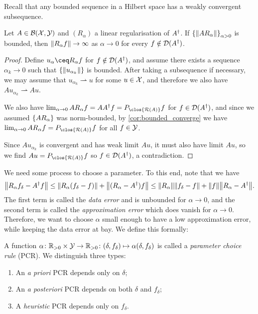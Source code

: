 \begin{recap}
	Recall that any bounded sequence in a Hilbert space has a weakly convergent subsequence. 
\end{recap}
\begin{theorem}
	Let $A \in \mathcal B(\mathcal X, \mathcal Y)$ and $(R_\alpha)$ a linear regularisation of $A^\dagger$. If $\qty{\norm{A R_\alpha}}_{\alpha > 0}$ is bounded, then $\norm{R_\alpha f} \to \infty$ as $\alpha \to 0$ for every $f \notin \operatorname{\mathcal D}(A^\dagger)$. 
\end{theorem}

\begin{proof}
	Define $u_\alpha \ceq R_\alpha f$ for $f \notin \operatorname{\mathcal D}(A^\dagger)$, and assume there exists a sequence $\alpha_k \to 0$ such that $\qty{\norm{u_{\alpha_k}}}$ is bounded. After taking a subsequence if necessary, we may assume that $u_{\alpha_k} \rightharpoonup u$ for some $u \in \mathcal X$, and therefore we also have $Au_{\alpha_k} \rightharpoonup Au$. 
	
	We also have $\lim_{\alpha \to 0} A R_\alpha f = AA\D f = P_{\clos{\Ran(A)}}f$ for $f \in \operatorname{\mathcal D}(A^\dagger)$, and since we assumed $\qty{A R_\alpha}$ was norm-bounded, by \cref{cor:bounded_converge} we have $\lim_{\alpha \to 0} AR_\alpha f = P_{\clos{\Ran(A)}} f$ for all $f \in \mathcal Y$. 
	
	Since $Au_{\alpha_k}$ is convergent and has weak limit $Au$, it must also have limit $Au$, so we find $Au = P_{\clos{\Ran(A)}} f$ so $f \in \operatorname{\mathcal D}(A^\dagger)$, a contradiction. 
\end{proof}

We need some process to choose a parameter. To this end, note that we have
\[
\norm{R_\alpha f_\delta - A^\dagger f} \leq \norm{R_\alpha (f_\delta - f)} + \norm{(R_\alpha - A^\dagger) f} \\
\leq  \norm{R_\alpha} \norm{f_\delta - f} + \norm{f} \norm{R_\alpha - A^\dagger}. 
\]
The first term is called the \emph{data error} and is unbounded for $\alpha \to 0$, and the second term is called the \emph{approximation error} which does vanish for $\alpha \to 0$. Therefore, we want to choose $\alpha$ small enough to have a low approximation error, while keeping the data error at bay. We define this formally:

\begin{definition}
	A function $\alpha \colon  \mathbb R_{> 0} \times \mathcal Y \to \mathbb R_{> 0} \colon (\delta, f_\delta) \mapsto \alpha(\delta, f_\delta)$ is called a \emph{parameter choice rule} (PCR). We distinguish three types:
	\begin{enumerate}
		\item An \emph{a priori} PCR depends only on $\delta$;
		\item An \emph{a posteriori} PCR depends on both $\delta$ and $f_\delta$;
		\item A \emph{heuristic} PCR depends only on $f_\delta$. 
	\end{enumerate}
\end{definition}

